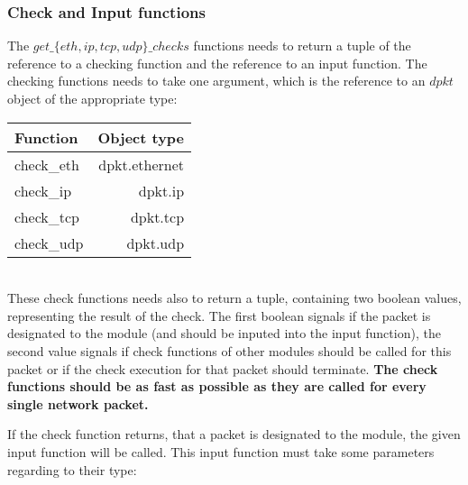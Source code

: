 \documentclass[a4paper, 11pt]{article}
\begin{document}
            \subsubsection{Check and Input functions}
            \label{check-input-func}

                The $get\_\{eth,ip,tcp,udp\}\_checks$ functions needs to return a tuple of the reference to a checking function and the reference to an input function. The checking functions needs to take one argument, which is the reference to an $dpkt$ object of the appropriate type:
                \\
                
                \begin{tabular}{|l|r|}
                    \hline
                    Function & Object type\\
                    \hline
                    \hline
                    check\_eth & dpkt.ethernet\\
                    check\_ip & dpkt.ip\\
                    check\_tcp & dpkt.tcp\\
                    check\_udp & dpkt.udp\\
                    \hline
                \end{tabular}
                \\
                
                These check functions needs also to return a tuple, containing two boolean values, representing the result of the check. The first boolean signals if the packet is designated to the module (and should be inputed into the input function), the second value signals if check functions of other modules should be called for this packet or if the check execution for that packet should terminate.
                \textbf{The check functions should be as fast as possible as they are called for every single network packet.}
                
                If the check function returns, that a packet is designated to the module, the given input function will be called. This input function must take some parameters regarding to their type:
                \\
                
\end{document}
